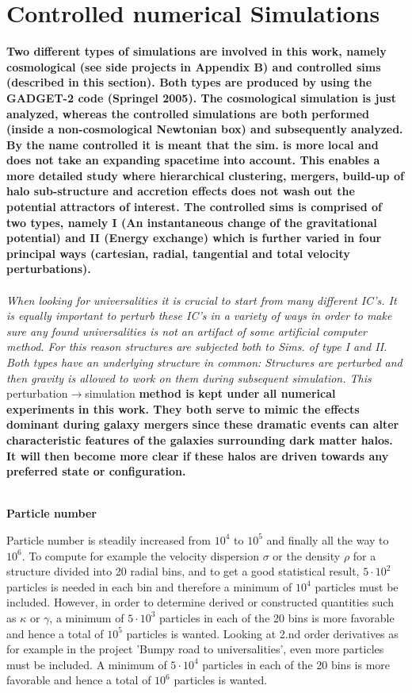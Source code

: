 \section{Controlled numerical Simulations}
\textbf{Two different types of simulations are involved in this work, namely cosmological (see side projects in Appendix B) and controlled sims (described in this section). Both types are produced by using the GADGET-2 code (Springel 2005). The cosmological simulation is just analyzed, whereas the controlled simulations are both performed (inside a non-cosmological Newtonian box) and subsequently analyzed. By the name controlled it is meant that the sim. is more local and does not take an expanding spacetime into account. This enables a more detailed study where hierarchical clustering, mergers, build-up of halo sub-structure and accretion effects does not wash out the potential attractors of interest. The controlled sims is comprised of two types, namely I (An instantaneous change of the gravitational potential) and II (Energy exchange) which is further varied in four principal ways (cartesian, radial, tangential and total velocity perturbations).} \\ \\

\textit{When looking for universalities it is crucial to start from many different IC's. It is equally important to perturb these IC's in a variety of ways in order to make sure any found universalities is not an artifact of some artificial computer method. For this reason structures are subjected both to Sims. of type I and II. Both types have an underlying structure in common: Structures are perturbed and then gravity is allowed to work on them during subsequent simulation. This} perturbation$\rightarrow$simulation \textbf{method is kept under all numerical experiments in this work. They both serve to mimic the effects dominant during galaxy mergers since these dramatic events can alter characteristic features of the galaxies surrounding dark matter halos. It will then become more clear if these halos are driven towards any preferred state or configuration.} \\ \\

\centerline{\textbf{Particle number}} 
Particle number is steadily increased from $10^4$ to $10^5$ and finally all the way to $10^6$. To compute for example the velocity dispersion $\sigma$ or the density $\rho$ for a structure divided into 20 radial bins, and to get a good statistical result, $5\cdot 10^2$ particles is needed in each bin and therefore a minimum of $10^4$ particles must be included. However, in order to determine derived or constructed quantities such as $\kappa$ or $\gamma$, a minimum of $5\cdot 10^3$ particles in each of the 20 bins is more favorable and hence a total of $10^5$ particles is wanted. Looking at 2.nd order derivatives as for example in the project 'Bumpy road to universalities', even more particles must be included. A minimum of $5\cdot 10^4$ particles in each of the 20 bins is more favorable and hence a total of $10^6$ particles is wanted. \\

